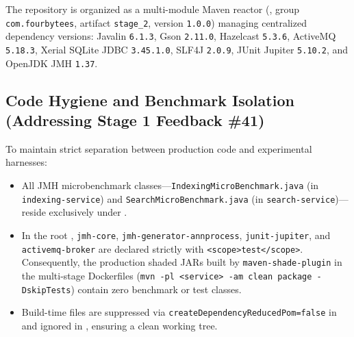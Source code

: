 \documentclass[10pt,a4paper]{article}
\begin{document}
The repository is organized as a multi-module Maven reactor (, group \texttt{com.fourbytees}, artifact \texttt{stage\_2}, version \texttt{1.0.0}) managing centralized dependency versions: Javalin \texttt{6.1.3}, Gson \texttt{2.11.0}, Hazelcast \texttt{5.3.6}, ActiveMQ \texttt{5.18.3}, Xerial SQLite JDBC \texttt{3.45.1.0}, SLF4J \texttt{2.0.9}, JUnit Jupiter \texttt{5.10.2}, and OpenJDK JMH \texttt{1.37}.

\subsection{Code Hygiene and Benchmark Isolation (Addressing Stage 1 Feedback \#41)}
To maintain strict separation between production code and experimental harnesses:
\begin{itemize}[leftmargin=*,nosep]
    \item All JMH microbenchmark classes---\texttt{IndexingMicroBenchmark.java} (in \texttt{indexing-service}) and \texttt{SearchMicroBenchmark.java} (in \texttt{search-service})---reside exclusively under .
    \item In the root , \texttt{jmh-core}, \texttt{jmh-generator-annprocess}, \texttt{junit-jupiter}, and \texttt{activemq-broker} are declared strictly with \texttt{<scope>test</scope>}. Consequently, the production shaded JARs built by \texttt{maven-shade-plugin} in the multi-stage Dockerfiles (\texttt{mvn -pl <service> -am clean package -DskipTests}) contain zero benchmark or test classes.
    \item Build-time  files are suppressed via \texttt{createDependencyReducedPom=false} in  and ignored in , ensuring a clean working tree.
\end{itemize}
\end{document}
